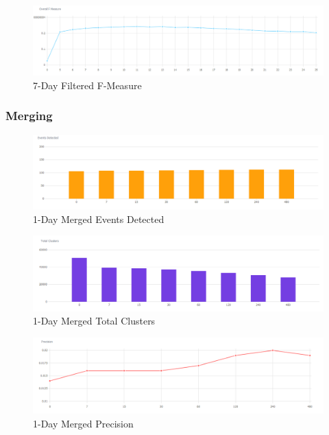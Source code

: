 \documentclass[a4paper,portrait,12pt]{article}
\begin{document}
\begin{figure}[H]
	\centering
	\includegraphics[width=\linewidth]{images/7days-filtered-f-measure.png}
	\caption{7-Day Filtered F-Measure}
	\label{fig:7days-filtered-f-measure}
\end{figure}

\subsubsection{Merging}

\begin{figure}[H]
	\centering
	\includegraphics[width=\linewidth]{images/7days-merged-events-detected.png}
	\caption{1-Day Merged Events Detected}
	\label{fig:7days-merged-events-detected}
\end{figure}

\begin{figure}[H]
	\centering
	\includegraphics[width=\linewidth]{images/7days-merged-total-clusters.png}
	\caption{1-Day Merged Total Clusters}
	\label{fig:7days-merged-total-clusters}
\end{figure}

\begin{figure}[H]
	\centering
	\includegraphics[width=\linewidth]{images/7days-merged-precision.png}
	\caption{1-Day Merged Precision}
	\label{fig:7days-merged-precision}
\end{figure}
\end{document}
